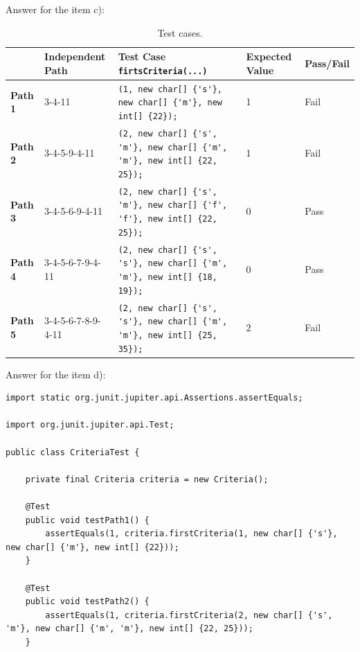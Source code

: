\begin{solution}
    Answer for the item c):
    
    \begin{table}[H]
        \centering
        \renewcommand{\arraystretch}{1.2}
        \caption{Test cases.}
        \label{tab:e8-test-cases}
        \begin{adjustbox}{max width=\textwidth}
            \begin{tabular}{lllll}
                \toprule
                 & Independent Path & Test Case \lstinline!firtsCriteria(...)! & Expected Value & Pass/Fail\\
                \midrule
                \textbf{Path 1} & 3-4-11 & \lstinline!(1, new char[] {'s'}, new char[] {'m'}, new int[] {22});! & 1 & Fail\\
                \textbf{Path 2} & 3-4-5-9-4-11 & \lstinline!(2, new char[] {'s', 'm'}, new char[] {'m', 'm'}, new int[] {22, 25});! & 1 & Fail\\
                \textbf{Path 3} & 3-4-5-6-9-4-11 & \lstinline!(2, new char[] {'s', 'm'}, new char[] {'f', 'f'}, new int[] {22, 25});! & 0 & Pass\\
                \textbf{Path 4} & 3-4-5-6-7-9-4-11 & \lstinline!(2, new char[] {'s', 's'}, new char[] {'m', 'm'}, new int[] {18, 19});! & 0 & Pass\\
                \textbf{Path 5} & 3-4-5-6-7-8-9-4-11 & \lstinline!(2, new char[] {'s', 's'}, new char[] {'m', 'm'}, new int[] {25, 35});! & 2 & Fail\\
                \bottomrule
            \end{tabular}
        \end{adjustbox}
    \end{table}
    
    Answer for the item d):
    
    \begin{lstlisting}[caption={All of the test cases that are defined by the independent paths of the recruitment program.}]
import static org.junit.jupiter.api.Assertions.assertEquals;

import org.junit.jupiter.api.Test;

public class CriteriaTest {
	
    private final Criteria criteria = new Criteria();
    
    @Test
    public void testPath1() {
        assertEquals(1, criteria.firstCriteria(1, new char[] {'s'}, new char[] {'m'}, new int[] {22}));
    }
    
    @Test
    public void testPath2() {
        assertEquals(1, criteria.firstCriteria(2, new char[] {'s', 'm'}, new char[] {'m', 'm'}, new int[] {22, 25}));
    }
    

\end{lstlisting}
\end{solution}
